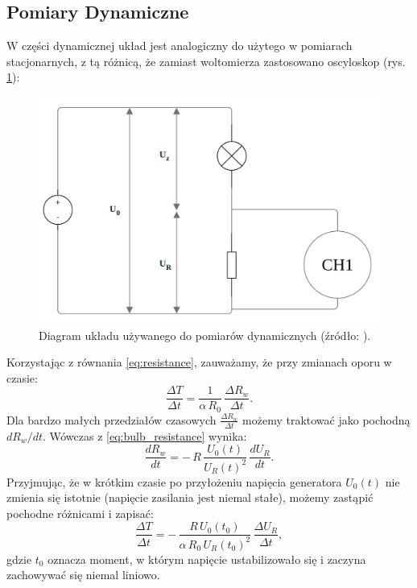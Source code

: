 \documentclass[12pt]{article}
\begin{document}
\subsection{Pomiary Dynamiczne}
W części dynamicznej układ jest analogiczny do użytego w pomiarach stacjonarnych, z tą różnicą, że zamiast woltomierza zastosowano oscyloskop (rys. \ref{fig:pomiar_dyn}):
\begin{figure}[H]
    \centering
    \includegraphics[scale=0.25]{dynamic}
    \caption{Diagram układu używanego do pomiarów dynamicznych (źródło: \cite{diagram}).}
    \label{fig:pomiar_dyn}
\end{figure}

Korzystając z równania \eqref{eq:resistance}, zauważamy, że przy zmianach oporu w czasie:
\begin{equation}
    \frac{\Delta T}{\Delta t} = \frac{1}{\alpha\,R_0}\,\frac{\Delta R_w}{\Delta t}.
    \label{eq:temp_der}
\end{equation}
Dla bardzo małych przedziałów czasowych $\frac{\Delta R_w}{\Delta t}$ możemy traktować jako pochodną $d R_w / d t$. Wówczas z \eqref{eq:bulb_resistance} wynika:
\begin{equation}
    \frac{d R_w}{d t} = -\,R\,\frac{U_0(t)}{U_R(t)^2}\,\frac{d U_R}{dt}.
    \label{eq:bulb_der}
\end{equation}
Przyjmując, że w krótkim czasie po przyłożeniu napięcia generatora $U_0(t)$ nie zmienia się istotnie (napięcie zasilania jest niemal stałe), możemy zastąpić pochodne różnicami i zapisać:
\begin{equation}
    \frac{\Delta T}{\Delta t} = -\,\frac{R\,U_0(t_0)}{\alpha\,R_0\,U_R(t_0)^2}\,\frac{\Delta U_R}{\Delta t},
    \label{eq:temp_delta}
\end{equation}
gdzie $t_0$ oznacza moment, w którym napięcie ustabilizowało się i zaczyna zachowywać się niemal liniowo.
\end{document}
